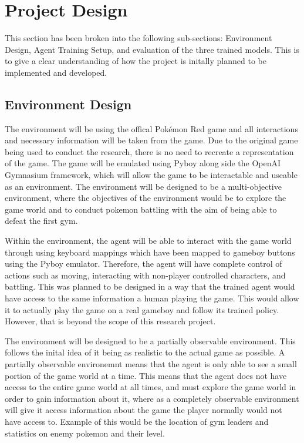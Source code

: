 \section{Project Design}

This section has been broken into the following sub-sections: Environment Design, Agent Training Setup, and evaluation of the three trained models. This is to give a clear understanding of how the project is initally planned to be implemented and developed.

\subsection{Environment Design}

The environment will be using the offical Pokémon Red game and all interactions and necessary information will be taken from the game. Due to the original game being used to conduct the research, there is no need to recreate a representation of the game. The game will be emulated using Pyboy along side the OpenAI Gymnasium framework, which will allow the game to be interactable and useable as an environment. The environment will be designed to be a multi-objective environment, where the objectives of the environment would be to explore the game world and to conduct pokemon battling with the aim of being able to defeat the first gym. 

Within the environment, the agent will be able to interact with the game world through using keyboard mappings which have been mapped to gameboy buttons using the Pyboy emulator. Therefore, the agent will have complete control of actions such as moving, interacting with non-player controlled characters, and battling. This was planned to be designed in a way that the trained agent would have access to the same information a human playing the game. This would allow it to actually play the game on a real gameboy and follow its trained policy. However, that is beyond the scope of this research project.

The environment will be designed to be a partially observable environment. This follows the inital idea of it being as realistic to the actual game as possible. A partially observable environemnt means that the agent is only able to see a small portion of the game world at a time. This means that the agent does not have access to the entire game world at all times, and must explore the game world in order to gain information about it, where as a completely observable environment will give it access information about the game the player normally would not have access to. Example of this would be the location of gym leaders and statistics on enemy pokemon and their level. 

